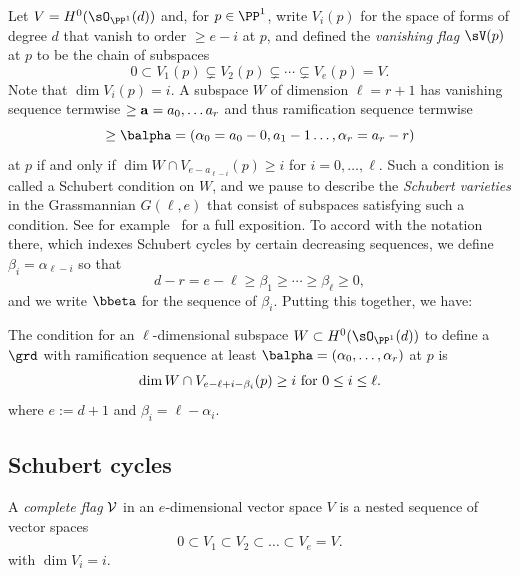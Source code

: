 Let $V =H^{0}(\sO_{\PP^{1}}(d))$ and, for $p\in \PP^{1}$, write $V_{i}(p)$ for the space of
forms of degree $d$ that vanish to order $\geq e-i$ at $p$, and defined the \emph{vanishing flag} $\sV(p)$ at $p$
to be the chain of subspaces
$$
0\subset V_{1}(p) \subsetneq V_{2}(p) \subsetneq\cdots\subsetneq V_{e}(p) = V.
$$
Note that $\dim V_{i}(p) = i$.
A subspace $W$ of dimension $\ell = r+1$ has vanishing sequence termwise $\geq {\bf a} = a_{0}, \dots a_{r}$ and thus
ramification sequence termwise
$$
\geq \balpha = (\alpha_{0} = a_{0}-0, a_{1}-1 \dots, \alpha_{r}= a_{r}-r)
$$
 at $p$ if and only if
$\dim W\cap V_{e-a_{\ell-i}}(p)\geq  i$  for  $i = 0,\dots, \ell$.
Such a condition is called a Schubert condition
on $W$, and we pause to describe the \emph{Schubert varieties} in
the Grassmannian $G(\ell, e)$ that consist
of subspaces satisfying such a condition. See for example~\cite[Chapters 3 and 4]{3264} for a full exposition.
To accord with the notation there, which indexes Schubert cycles by certain decreasing sequences,
we define $\beta_{i} = \alpha_{\ell-i}$ so that
$$
d-r = e-\ell \geq \beta_{1} \geq \cdots \geq \beta_{\ell}\geq 0,
$$
and we write $\bbeta$ for the sequence of $\beta_{i}$. Putting this together, we have:
\begin{proposition}\label{ramification}
The condition for an $\ell$-dimensional subspace $W \subset H^{0}(\sO_{\PP^{1}}(d))$
to define a $\grd$ with ramification sequence at least $\balpha =(\alpha_{0},\dots, \alpha_{r})$ at $p$ is
$$
\dim W\cap V_{e-\ell+i-\beta_{i}}(p)\geq  i \hbox{ for } 0\leq i \leq \ell.
$$
where $e:=d+1$ and $\beta_{i} = \ell-\alpha_{i}$.
\end{proposition}



\subsection{Schubert cycles}\label{Schubert1}

\begin{definition}
A \emph{complete flag} $\cal V$  in an $e$-dimensional vector space $V$ is a nested sequence of vector spaces
$$
0 \subset V_1 \subset V_2 \subset \dots  \subset V_{e} = V.
$$
with $\dim V_i = i$.
\end{definition}

